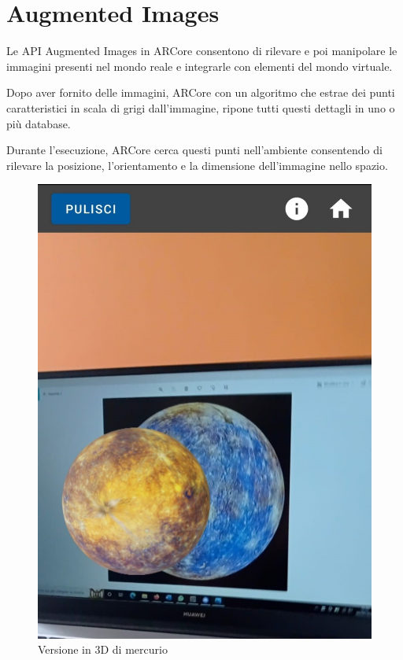 \documentclass[crop=false, class=book]{standalone}
\begin{document}
	\chapter{Augmented Images}
	
	
	Le API Augmented Images in ARCore consentono di rilevare e poi manipolare le immagini presenti nel mondo reale e integrarle con elementi del mondo virtuale.
	
	Dopo aver fornito delle immagini, ARCore con un algoritmo che estrae dei punti caratteristici in scala di grigi dall’immagine, ripone tutti questi dettagli in uno o più database.
	
	Durante l’esecuzione, ARCore cerca questi punti nell’ambiente consentendo di rilevare la posizione, l’orientamento e la dimensione dell’immagine nello spazio.
\begin{figure}
\centering
\includegraphics[scale=0.3]{Img1.jpeg}
\caption{Versione in 3D di mercurio} 
\end{figure}
\end{document}

